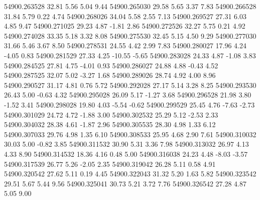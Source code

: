 54900.263528       32.81        5.56        5.04        9.44
54900.265030       29.58        5.65        3.37        7.83
54900.266528       31.84        5.79        0.22        4.74
54900.268026       34.04        5.58        2.55        7.13
54900.269527       27.31        6.03        4.85        9.47
54900.271025       29.23        4.87       -1.81        2.86
54900.272526       32.27        5.75        0.21        4.92
54900.274028       33.35        5.18        3.32        8.08
54900.275530       32.45        5.15        4.50        9.29
54900.277030       31.66        5.46        3.67        8.50
54900.278531       24.55        4.42        2.99        7.83
54900.280027       17.96        4.24       -4.05        0.83
54900.281529       27.33        4.25      -10.55       -5.65
54900.283028       24.33        4.87       -1.08        3.83
54900.284525       27.81        4.75       -4.01        0.93
54900.286027       24.88        4.88       -0.43        4.52
54900.287525       32.07        5.02       -3.27        1.68
54900.289026       28.74        4.92        4.00        8.96
54900.290527       31.17        4.81        0.76        5.72
54900.292028       27.17        5.14        3.28        8.25
54900.293530       26.43        5.00       -0.63        4.32
54900.295028       26.09        5.17       -1.27        3.68
54900.296528       21.98        3.80       -1.52        3.41
54900.298028       19.80        4.03       -5.54       -0.62
54900.299529       25.45        4.76       -7.63       -2.73
54900.301029       24.72        4.72       -1.88        3.00
54900.302532       25.29        5.12       -2.53        2.33
54900.304032       28.38        4.61       -1.87        2.96
54900.305535       28.30        4.98        1.33        6.12
54900.307033       29.76        4.98        1.35        6.10
54900.308533       25.95        4.68        2.90        7.61
54900.310032       30.03        5.00       -0.82        3.85
54900.311532       30.90        5.31        3.36        7.98
54900.313032       26.97        4.13        4.33        8.90
54900.314532       18.36        4.16        0.48        5.00
54900.316038       24.23        4.48       -8.03       -3.57
54900.317539       26.77        5.26       -2.05        2.35
54900.319042       26.28        5.11        0.58        4.91
54900.320542       27.62        5.11        0.19        4.45
54900.322043       31.32        5.20        1.63        5.82
54900.323542       29.51        5.67        5.44        9.56
54900.325041       30.73        5.21        3.72        7.76
54900.326542       27.28        4.87        5.05        9.00
